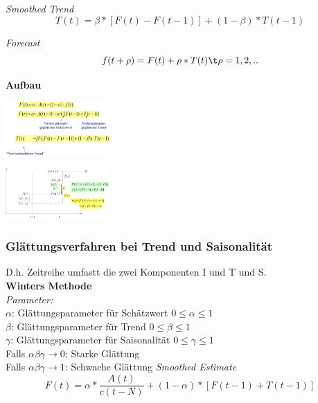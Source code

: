 \documentclass{report}
\newenvironment{Figure}
	{\par\medskip\noindent\minipage{\linewidth}}
	{\endminipage\par\medskip}
\theoremstyle{definition}
\theoremstyle{example}
\begin{document}
   \textit{Smoothed Trend}
\begin{equation}
   T(t) = \beta * [F(t) - F(t-1)] + (1-\beta) * T(t-1)
\end{equation}

   \textit{Forecast}
\begin{equation}
      f(t+\rho) = F(t)+\rho * T(t) \t \rho = 1,2,..
\end{equation}

\textbf{Aufbau}\\
\begin{Figure}
\centering
\includegraphics[width=150px]{img/Aufbau.png}
	\label{fig:Aufbau der Exponentielle Glättung mit Trend}
\end{Figure}

\begin{Figure}
\centering
\includegraphics[width=150px]{img/Illustration.png}
	\label{fig:Illustration der Berechnung  Exponentielle Glättung mit Trend}
\end{Figure}

      \subsubsection{Glättungsverfahren bei Trend und Saisonalität}
D.h. Zeitreihe umfastt die zwei Komponenten I und T und S.\\
\textbf{Winters Methode}\\
\textit{Parameter:}\\
$\alpha$: Glättungsparameter für Schätzwert $0 \leq \alpha \leq 1$\\
$\beta$: Glättungsparameter für Trend $0 \leq \beta \leq 1$\\
$\gamma$: Glättungsparameter für Saisonalität $0 \leq \gamma \leq 1$\\
Falls $\alpha \beta \gamma \rightarrow 0$: Starke Glättung\\
Falls $\alpha \beta \gamma \rightarrow 1$: Schwache Glättung 
   \textit{Smoothed Estimate}
\begin{equation}
   F(t) = \alpha * \frac{A(t)}{c(t-N)} + (1-\alpha)*[F(t-1) + T(t-1)]
\end{equation}
\end{document}
